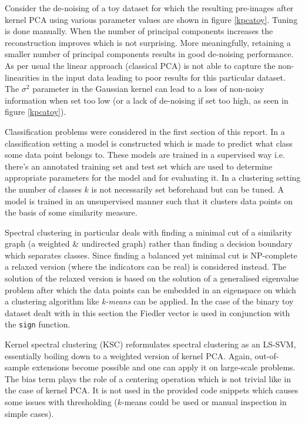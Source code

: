 \par Consider the de-noising of a toy dataset for which the resulting pre-images after kernel PCA using various parameter values are shown in figure \ref{kpcatoy}. Tuning is done manually. When the number of principal components increases the reconstruction improves which is not surprising. More meaningfully, retaining a smaller number of principal components results in good de-noising performance. As per usual the linear approach (classical PCA) is not able to capture the non-linearities in the input data leading to poor results for this particular dataset. The $\sigma^2$ parameter in the Gaussian kernel can lead to a loss of non-noisy information when set too low (or a lack of de-noising if set too high, as seen in figure \ref{kpcatoy}).


Classification problems were considered in the first section of this report. In a classification setting a model is constructed which is made to predict what class some data point belongs to. These models are trained in a supervised way i.e. there's an annotated training set and test set which are used to determine appropriate parameters for the model and for evaluating it. In a clustering setting the number of classes $k$ is not necessarily set beforehand but can be tuned. A model is trained in an unsupervised manner such that it clusters data points on the basis of some similarity measure. 

\par Spectral clustering in particular deals with finding a minimal cut of a similarity graph (a weighted \& undirected graph) rather than finding a decision boundary which separates classes. Since finding a balanced yet minimal cut is NP-complete a relaxed version (where the indicators can be real) is considered instead. The solution of the relaxed version is based on the solution of a generalised eigenvalue problem after which the data points can be embedded in an eigenspace on which a clustering algorithm like \textit{k-means} can be applied. In the case of the binary toy dataset dealt with in this section the Fiedler vector is used in conjunction with the \texttt{sign} function.

\par Kernel spectral clustering (KSC) reformulates spectral clustering as an LS-SVM, essentially boiling down to a weighted version of kernel PCA. Again, out-of-sample extensions become possible and one can apply it on large-scale problems. The bias term plays the role of a centering operation which is not trivial like in the case of kernel PCA. It is not used in the provided code snippets which causes some issues with thresholding ($k$-means could be used or manual inspection in simple cases).

